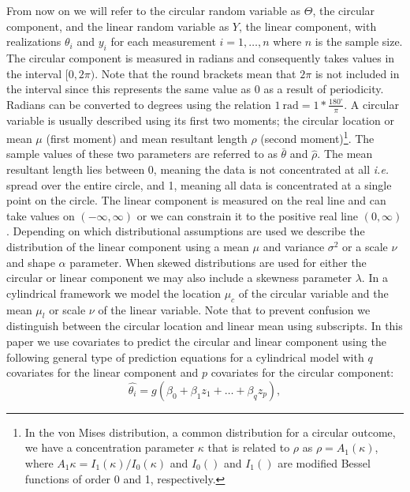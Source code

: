 \documentclass[man,mask]{apa6}
\let\rmarkdownfootnote\footnote%
\def\footnote{\protect\rmarkdownfootnote}
\begin{document}
\indent From now on we will refer to the circular random variable as \(\Theta\),
the circular component, and the linear random variable as \(Y\), the linear
component, with realizations \(\theta_i\) and \(y_i\) for each measurement \(i=1, \dots, n\) where \(n\) is the sample size. The circular component is measured in
radians and consequently takes values in the interval \([0, 2\pi)\). Note that the
round brackets mean that \(2\pi\) is not included in the interval since this
represents the same value as 0 as a result of periodicity. Radians can be
converted to degrees using the relation \(1 \:\text{rad} = 1*\frac{180^\circ}{\pi}\). A circular variable is usually described using its
first two moments; the circular location or mean \(\mu\) (first moment) and mean resultant length
\(\rho\) (second moment)\footnote{In the von Mises distribution, a common distribution for a
circular outcome, we have a concentration parameter $\kappa$ that is related to
$\rho$ as $\rho = A_1(\kappa)$, where $A_1{\kappa} = I_1(\kappa)/I_0(\kappa)$
and $I_0()$ and $I_1()$ are modified Bessel functions of order 0 and 1,
respectively.}. The sample values of these two parameters are referred to as
\(\bar{\theta}\) and \(\hat{\rho}\). The mean resultant length lies between 0,
meaning the data is not concentrated at all \emph{i.e.} spread over the entire
circle, and 1, meaning all data is concentrated at a single point on the circle.
The linear component is measured on the real line and can take values on
\((-\infty, \infty)\) or we can constrain it to the positive real line \((0, \infty)\). Depending on which distributional assumptions are used we describe the
distribution of the linear component using a mean \(\mu\) and variance \(\sigma^2\)
or a scale \(\nu\) and shape \(\alpha\) parameter. When skewed distributions are
used for either the circular or linear component we may also include a skewness
parameter \(\lambda\).\newline
\indent In a cylindrical framework we model the location \(\mu_c\) of the circular
variable and the mean \(\mu_l\) or scale \(\nu\) of the linear variable. Note that
to prevent confusion we distinguish between the circular location and linear
mean using subscripts. In this paper we use covariates to predict the circular
and linear component using the following general type of prediction equations
for a cylindrical model with \(q\) covariates for the linear component and \(p\)
covariates for the circular component:
\begin{equation}\label{circpredgen}
\hat{\theta_i} = g(\beta_0 + \beta_1z_1 + \dots + \beta_qz_p),
\end{equation}
\end{document}
